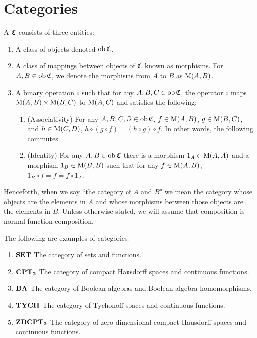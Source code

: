 \section{Categories}
\label{categories}

\begin{definition}
	A  \( \mathfrak{C} \) consists of three entities:
	\begin{enumerate}
		\item A class of objects denoted \( \operatorname{ob}{\mathfrak{C}} \).
		\item A class of mappings between objects of \( \mathfrak{C} \) known as morphisms.  For \( A,B \in \operatorname{ob}{\mathfrak{C}} \), we denote the morphisms from \( A \) to \( B \) as \( \operatorname{M}(A,B) \).
		\item A binary operation \( \circ \) such that for any \( A,B,C \in \operatorname{ob}{\mathfrak{C}} \), the operator \( \circ \) maps \( \operatorname{M}(A,B) \times \operatorname{M}(B,C) \) to \( \operatorname{M}(A,C) \) and satisfies the following:
		\begin{enumerate}
			\item (Associativity) For any \( A,B,C,D \in \operatorname{ob}{\mathfrak{C}} \), \( f \in \operatorname{M}(A,B) \), \( g \in \operatorname{M}(B,C) \), and \( h \in \operatorname{M}(C,D) \), \( h \circ ( g \circ f ) = (h \circ g) \circ f \).  In other words, the following commutes.
			\item (Identity) For any \( A,B \in \operatorname{ob}{\mathfrak{C}} \) there is a morphism \( 1_A \in \operatorname{M}(A,A) \) and a morphism \( 1_B \in \operatorname{M}(B,B) \) such that for any \( f \in \operatorname{M}(A,B) \), \( 1_B \circ f = f = f \circ 1_A \).
		\end{enumerate}
	\end{enumerate}
\end{definition}

Henceforth, when we say ``the category of \( A \) and \( B \)" we mean the category whose objects are the elements in \( A \) and whose morphisms between those objects are the elements in \( B \).  Unless otherwise stated, we will assume that composition is normal function composition.

\begin{examples}
	The following are examples of categories.
	\begin{enumerate}
		\item \( \bf{SET} \) The category of sets and functions.
		\item \( \bf{CPT}_\mathbf{2} \) The category of compact Hausdorff spaces and continuous functions.
		\item \( \bf{BA} \) The category of Boolean algebras and Boolean algebra homomorphisms.
		\item \( \bf{TYCH} \) The category of Tychonoff spaces and continuous functions.
		\item \( \bf{ZDCPT}_\mathbf{2} \) The category of zero dimensional compact Hausdorff spaces and continuous functions.
	\end{enumerate}
\end{examples}

